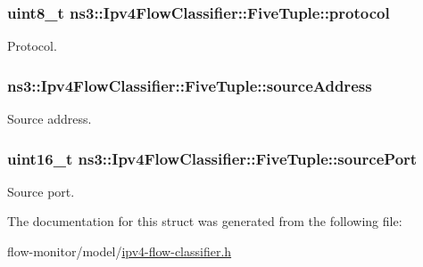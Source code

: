 \subsubsection[{\texorpdfstring{protocol}{protocol}}]{\setlength{\rightskip}{0pt plus 5cm}uint8\+\_\+t ns3\+::\+Ipv4\+Flow\+Classifier\+::\+Five\+Tuple\+::protocol}\hypertarget{structns3_1_1Ipv4FlowClassifier_1_1FiveTuple_a94e20ca3204cd84fe40f670bbad573d9}{}\label{structns3_1_1Ipv4FlowClassifier_1_1FiveTuple_a94e20ca3204cd84fe40f670bbad573d9}


Protocol. 

\subsubsection[{\texorpdfstring{source\+Address}{sourceAddress}}]{ ns3\+::\+Ipv4\+Flow\+Classifier\+::\+Five\+Tuple\+::source\+Address}\hypertarget{structns3_1_1Ipv4FlowClassifier_1_1FiveTuple_a86df4297013242a6ca3b7b9cc8b40547}{}\label{structns3_1_1Ipv4FlowClassifier_1_1FiveTuple_a86df4297013242a6ca3b7b9cc8b40547}


Source address. 

\subsubsection[{\texorpdfstring{source\+Port}{sourcePort}}]{\setlength{\rightskip}{0pt plus 5cm}uint16\+\_\+t ns3\+::\+Ipv4\+Flow\+Classifier\+::\+Five\+Tuple\+::source\+Port}\hypertarget{structns3_1_1Ipv4FlowClassifier_1_1FiveTuple_a9a69077c620ebb31fc34788219d7331d}{}\label{structns3_1_1Ipv4FlowClassifier_1_1FiveTuple_a9a69077c620ebb31fc34788219d7331d}


Source port. 



The documentation for this struct was generated from the following file\+:\begin{DoxyCompactItemize}
\item 
flow-\/monitor/model/\hyperlink{ipv4-flow-classifier_8h}{ipv4-\/flow-\/classifier.\+h}\end{DoxyCompactItemize}
